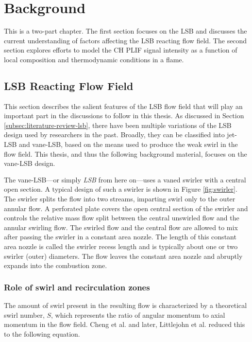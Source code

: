 \chapter{Background}
\label{ch:background}

This is a two-part chapter.
The first section focuses on the LSB and discusses the current understanding of factors affecting the LSB reacting flow field.
The second section explores efforts to model the CH PLIF signal intensity as a function of local composition and thermodynamic conditions in a flame.

\section{LSB Reacting Flow Field}

This section describes the salient features of the LSB flow field that will play an important part in the discussions to follow in this thesis.
As discussed in Section \ref{subsec:literature-review-lsb}, there have been multiple variations of the LSB design used by researchers in the past.
Broadly, they can be classified into jet-LSB and vane-LSB, based on the means used to produce the weak swirl in the flow field.
This thesis, and thus the following background material, focuses on the vane-LSB design.



The vane-LSB---or simply \emph{LSB} from here on---uses a vaned swirler
with a central open section.
A typical design of such a swirler is shown in Figure \ref{fig:swirler}.
The swirler splits the flow into two streams, imparting swirl only to the outer annular flow.
A perforated plate covers the open central section of the swirler and controls the relative mass flow split between the central unswirled flow and the annular swirling flow.
The swirled flow and the central flow are allowed to mix after passing the swirler in a constant area nozzle.
The length of this constant area nozzle is called the swirler recess length and is typically about one or two swirler (outer) diameters.
The flow leaves the constant area nozzle and abruptly expands into the combustion zone.

\subsection{Role of swirl and recirculation zones}

The amount of swirl present in the resulting flow is characterized by a theoretical swirl number, \(S\), which represents the ratio of angular momentum to axial momentum in the flow field.
Cheng et al.\cite{2000-cheng} and later, Littlejohn et al.\cite{2002-littlejohn} reduced this to the following equation.

